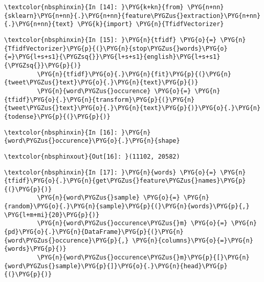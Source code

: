 \documentclass[letterpaper,10pt,english]{sphinxmanual}
\begin{document}
%
\begin{Verbatim}[commandchars=\\\{\}]
\textcolor{nbsphinxin}{In [14]: }\PYG{k+kn}{from} \PYG{n+nn}{sklearn}\PYG{n+nn}{.}\PYG{n+nn}{feature\PYGZus{}extraction}\PYG{n+nn}{.}\PYG{n+nn}{text} \PYG{k}{import} \PYG{n}{TfidfVectorizer}
\end{Verbatim}

%
\begin{Verbatim}[commandchars=\\\{\}]
\textcolor{nbsphinxin}{In [15]: }\PYG{n}{tfidf} \PYG{o}{=} \PYG{n}{TfidfVectorizer}\PYG{p}{(}\PYG{n}{stop\PYGZus{}words}\PYG{o}{=}\PYG{l+s+s1}{\PYGZsq{}}\PYG{l+s+s1}{english}\PYG{l+s+s1}{\PYGZsq{}}\PYG{p}{)}
         \PYG{n}{tfidf}\PYG{o}{.}\PYG{n}{fit}\PYG{p}{(}\PYG{n}{tweet\PYGZus{}text}\PYG{o}{.}\PYG{n}{text}\PYG{p}{)}
         \PYG{n}{word\PYGZus{}occurence} \PYG{o}{=} \PYG{n}{tfidf}\PYG{o}{.}\PYG{n}{transform}\PYG{p}{(}\PYG{n}{tweet\PYGZus{}text}\PYG{o}{.}\PYG{n}{text}\PYG{p}{)}\PYG{o}{.}\PYG{n}{todense}\PYG{p}{(}\PYG{p}{)}
\end{Verbatim}

%
\begin{Verbatim}[commandchars=\\\{\}]
\textcolor{nbsphinxin}{In [16]: }\PYG{n}{word\PYGZus{}occurence}\PYG{o}{.}\PYG{n}{shape}
\end{Verbatim}

%
\begin{Verbatim}[commandchars=\\\{\}]
\textcolor{nbsphinxout}{Out[16]: }(11102, 20582)
\end{Verbatim}

%
\begin{Verbatim}[commandchars=\\\{\}]
\textcolor{nbsphinxin}{In [17]: }\PYG{n}{words} \PYG{o}{=} \PYG{n}{tfidf}\PYG{o}{.}\PYG{n}{get\PYGZus{}feature\PYGZus{}names}\PYG{p}{(}\PYG{p}{)}
         \PYG{n}{word\PYGZus{}sample} \PYG{o}{=} \PYG{n}{random}\PYG{o}{.}\PYG{n}{sample}\PYG{p}{(}\PYG{n}{words}\PYG{p}{,} \PYG{l+m+mi}{20}\PYG{p}{)}
         \PYG{n}{word\PYGZus{}occurence\PYGZus{}m} \PYG{o}{=} \PYG{n}{pd}\PYG{o}{.}\PYG{n}{DataFrame}\PYG{p}{(}\PYG{n}{word\PYGZus{}occurence}\PYG{p}{,} \PYG{n}{columns}\PYG{o}{=}\PYG{n}{words}\PYG{p}{)}
         \PYG{n}{word\PYGZus{}occurence\PYGZus{}m}\PYG{p}{[}\PYG{n}{word\PYGZus{}sample}\PYG{p}{]}\PYG{o}{.}\PYG{n}{head}\PYG{p}{(}\PYG{p}{)}
\end{Verbatim}
\end{document}
